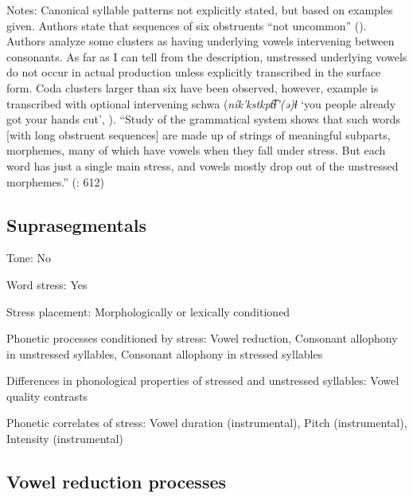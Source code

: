{\begin{appendixdesc}
\item[Notes:] Canonical syllable patterns not explicitly stated, but based on examples given. Authors state that sequences of six obstruents “not uncommon” (\citeyear[25]{ThompsonThompson1992}). Authors analyze some clusters as having underlying vowels intervening between consonants. As far as I can tell from the description, unstressed underlying vowels do not occur in actual production unless explicitly transcribed in the surface form. Coda clusters larger than six have been observed, however, example is transcribed with optional intervening schwa (\textit{ník’kstkpt͡ɬ’(ə)ɬ} ‘you people already got your hands cut’, \citeyear[25]{ThompsonThompson1992}). “Study of the grammatical system shows that such words [with long obstruent sequences] are made up of strings of meaningful subparts, morphemes, many of which have vowels when they fall under stress. But each word has just a single main stress, and vowels mostly drop out of the unstressed morphemes.” (\citealt{ThompsonEtAl1996}: 612)
\end{appendixdesc}
\subsection*{Suprasegmentals}
\begin{appendixdesc}
\item[Tone:] No

\item[Word stress:] Yes

\item[Stress placement:] Morphologically or lexically conditioned

\item[Phonetic processes conditioned by stress:] Vowel reduction, Consonant allophony in unstressed syllables, Consonant allophony in stressed syllables

\item[Differences in phonological properties of stressed and unstressed syllables:] Vowel quality contrasts

\item[Phonetic correlates of stress:] Vowel duration (instrumental), Pitch (instrumental), Intensity (instrumental)
\end{appendixdesc}
\subsection*{Vowel reduction processes}
\begin{appendixdesc}


\end{appendixdesc}}
